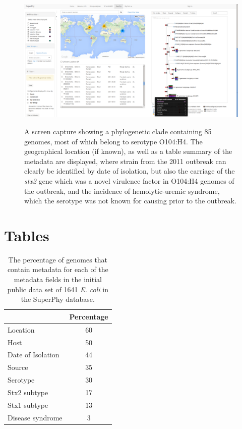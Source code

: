 \documentclass[doublespacing, linenumbers]{bmcart}
\begin{document}
\begin{backmatter}
\newpage
\begin{figure}[h!]
  \caption{A screen capture showing a phylogenetic clade containing 85 genomes, most of which belong to serotype O104:H4. The geographical location (if known), as well as a table summary of the metadata are displayed, where strain from the 2011 outbreak can clearly be identified by date of isolation, but also the carriage of the \textit{stx2} gene which was a novel virulence factor in O104:H4 genomes of the outbreak, and the incidence of hemolytic-uremic syndrome, which the serotype was not known for causing prior to the outbreak.}
  \includegraphics[width=0.9\columnwidth]{images/o104_clade.png}
  \label{fig:o104_clade}
\end{figure}



\section*{Tables}
\begin{table}[h!]
\caption{The percentage of genomes that contain metadata for each of the metadata fields in the initial public data set of 1641 \textit{E. coli} in the SuperPhy database.}
\label{tab:metadata}
      \begin{tabular}{lc}
        \hline
           & Percentage\\ \hline
        Location & 60\\
        Host & 50\\
        Date of Isolation & 44\\
        Source & 35\\
        Serotype & 30\\
        Stx2 subtype & 17\\
        Stx1 subtype & 13\\
        Disease syndrome & 3\\ 
      \end{tabular}
\end{table}


\end{backmatter}
\end{document}
